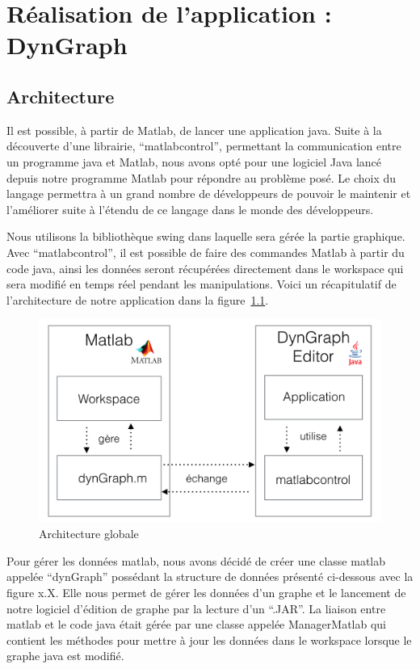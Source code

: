 \documentclass[pidr]{tnreport}
\begin{document}
\cleardoublepage

\chapter{Réalisation de l'application : DynGraph}

\section{Architecture}

Il est possible, à partir de Matlab, de lancer une application java. Suite à la découverte d’une librairie, “matlabcontrol”, permettant la communication entre un programme java et Matlab, nous avons opté pour une logiciel Java lancé depuis notre programme Matlab pour répondre au problème posé. Le choix du langage permettra à un grand nombre de développeurs de pouvoir le maintenir et l’améliorer suite à l’étendu de ce langage dans le monde des développeurs.

Nous utilisons la bibliothèque swing dans laquelle sera gérée la partie graphique. Avec “matlabcontrol”, il est possible de faire des commandes Matlab à partir du code java, ainsi les données seront récupérées directement dans le workspace qui sera modifié en temps réel pendant les manipulations. Voici un récapitulatif de l’architecture de notre application dans la figure~\ref{fig:architecture_global}.

\begin{figure}[h]
  \centering
  \includegraphics[width=15cm]{figures/architecture_global}
  \caption{Architecture globale}
  \label{fig:architecture_global}
\end{figure}

Pour gérer les données matlab, nous avons décidé de créer une classe matlab appelée “dynGraph” possédant la structure de données présenté ci-dessous avec la figure x.X. Elle nous permet de gérer les données d’un graphe et le lancement de notre logiciel d’édition de graphe par la lecture d’un “.JAR”. La liaison entre matlab et le code java était gérée par une classe appelée ManagerMatlab qui contient les méthodes pour mettre à jour les données dans le workspace lorsque le graphe java est modifié.
\end{document}

